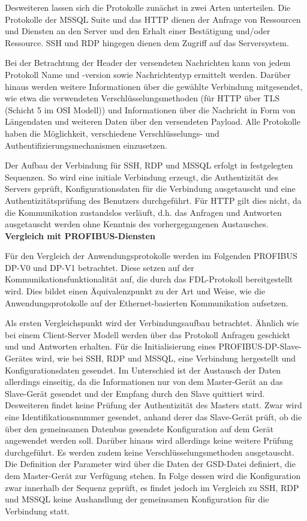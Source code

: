 Desweiteren lassen sich die Protokolle zunächst in zwei Arten unterteilen. Die Protokolle der MSSQL Suite und das HTTP dienen der Anfrage von Ressourcen und Diensten an den Server und den Erhalt einer Bestätigung und/oder Ressource. SSH und RDP hingegen dienen dem Zugriff auf das Serversystem. 

Bei der Betrachtung der Header der versendeten Nachrichten kann von jedem Protokoll Name und -version sowie Nachrichtentyp ermittelt werden. Darüber hinaus werden weitere Informationen über die gewählte Verbindung mitgesendet, wie etwa die verwendeten Verschlüsselungsmethoden (für  HTTP über TLS (Schicht 5 im OSI Modell))  und Informationen über die Nachricht in Form von Längendaten und weiteren Daten über den versendeten Payload. Alle Protokolle haben die Möglichkeit, verschiedene Verschlüsselungs- und Authentifizierungsmechanismen einzusetzen.

Der Aufbau der Verbindung für SSH, RDP und MSSQL erfolgt in festgelegten Sequenzen. So wird eine initiale Verbindung erzeugt, die Authentizität des Servers geprüft, Konfigurationsdaten für die Verbindung ausgetauscht und eine Authentizitätsprüfung des Benutzers durchgeführt. Für HTTP gilt dies nicht, da die Kommunikation zustandslos verläuft, d.h. das Anfragen und Antworten ausgetauscht werden ohne Kenntnis des vorhergegangenen Austausches.\\

\textbf{Vergleich mit PROFIBUS-Diensten}

Für den Vergleich der Anwendungsprotokolle werden im Folgenden PROFIBUS DP-V0 und DP-V1 betrachtet. Diese setzen auf der Kommunikationsfunktionalität auf, die durch das FDL-Protokoll bereitgestellt wird. Dies bildet einen Äquivalenzpunkt zu der Art und Weise, wie die Anwendungsprotokolle auf der Ethernet-basierten Kommunikation aufsetzen. 

Als ersten Vergleichspunkt wird der Verbindungsaufbau betrachtet. Ähnlich wie bei einem Client-Server Modell werden über das Protokoll Anfragen geschickt und und Antworten erhalten. Für die Initialisierung eines PROFIBUS-DP-Slave-Gerätes wird, wie bei SSH, RDP und MSSQL, eine Verbindung hergestellt und Konfigurationsdaten gesendet. Im Unterschied ist der Austausch der Daten allerdings einseitig, da die Informationen nur von dem Master-Gerät an das Slave-Gerät gesendet und der Empfang durch den Slave quittiert wird. Desweiteren findet keine Prüfung der Authentizität des Masters statt. Zwar wird eine Identifikationsnummer gesendet, anhand derer das Slave-Gerät prüft, ob die über den gemeinsamen Datenbus gesendete Konfiguration auf dem Gerät angewendet werden soll. Darüber hinaus wird allerdings keine weitere Prüfung durchgeführt. Es werden zudem keine Verschlüsselungsmethoden ausgetauscht. Die Definition der Parameter wird über die Daten der GSD-Datei definiert, die dem Master-Gerät zur Verfügung stehen. In Folge dessen wird die Konfiguration zwar innerhalb der Sequenz geprüft, es findet jedoch im Vergleich zu SSH, RDP und MSSQL keine Aushandlung der gemeinsamen Konfiguration für die Verbindung statt.

